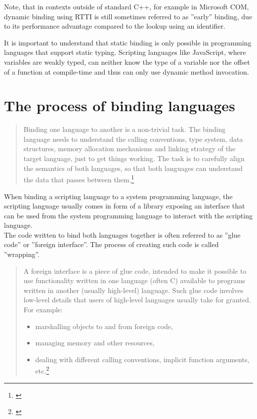Note, that in contexts outside of standard C++, for example in Microsoft COM, dynamic binding using RTTI is still sometimes referred to as ''early'' binding, due to its performance advantage compared to the lookup using an identifier.

It is important to understand that static binding is only possible in programming languages that support static typing. Scripting languages like JavaScript, where variables are weakly typed, can neither know the type of a variable nor the offset of a function at compile-time and thus can only use dynamic method invocation.

\section{The process of binding languages}

\begin{quotation}
Binding one language to another is a non-trivial task. The binding language needs to understand the calling conventions, type system, data structures, memory allocation mechanisms and linking strategy of the target language, just to get things working. The task is to carefully align the semantics of both languages, so that both languages can understand the data that passes between them.\footnote{\citep{RealWorldHaskell}}
\end{quotation}

When binding a scripting language to a system programming language, the scripting language usually comes in form of a library exposing an interface that can be used from the system programming language to interact with the scripting language.\\
The code written to bind both languages together is often referred to as ''glue code'' or ''foreign interface''. The process of creating such code is called ''wrapping''.

\begin{quotation}
A foreign interface is a piece of glue code, intended to make it possible to use functionality written in one language (often C) available to programs written in another (usually high-level) language. Such glue code involves low-level details that users of high-level languages usually take for granted. For example:
\begin{itemize}
\item marshalling objects to and from foreign code,
\item managing memory and other resources,
\item dealing with different calling conventions, implicit function arguments, etc.\footnote{\citep{FFIScheme}}
\end{itemize}
\end{quotation}

